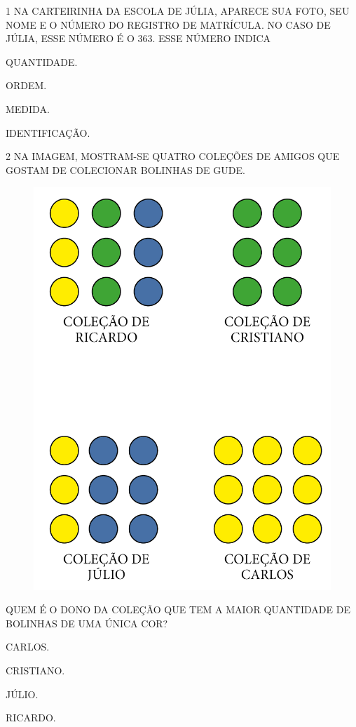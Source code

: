 \num{1} NA CARTEIRINHA DA ESCOLA DE JÚLIA, APARECE SUA FOTO, SEU NOME E O NÚMERO DO
REGISTRO DE MATRÍCULA. NO CASO DE JÚLIA, ESSE NÚMERO É O 363. ESSE NÚMERO INDICA

\begin{multicols}{2}
\begin{escolha}
\item
  QUANTIDADE.
\item
  ORDEM.
\item
  MEDIDA.
\item
  IDENTIFICAÇÃO.
\end{escolha}
\end{multicols}

\num{2} NA IMAGEM, MOSTRAM-SE QUATRO COLEÇÕES DE AMIGOS QUE GOSTAM DE COLECIONAR
BOLINHAS DE GUDE.

\begin{figure}[H]
\centering
\includegraphics[width=.7\textwidth]{./media/SAEB_1ANO_MAT_FIGURA16.png}
\end{figure}

\noindent{}QUEM É O DONO DA COLEÇÃO QUE TEM A MAIOR QUANTIDADE DE BOLINHAS DE UMA ÚNICA COR?

\begin{escolha}
\item
  CARLOS.
\item
  CRISTIANO.
\item
  JÚLIO.
\item
  RICARDO.
\end{escolha}

